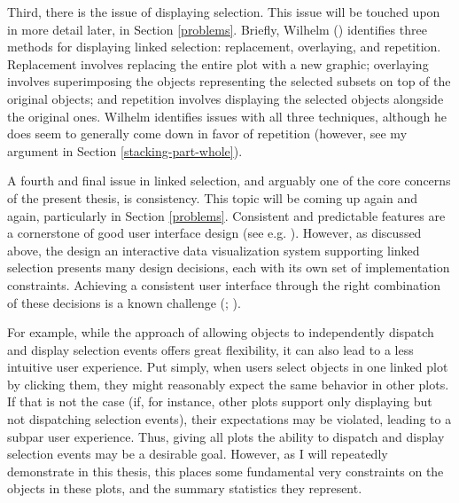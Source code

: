 \documentclass[
  openany]{book}
\theoremstyle{definition}
\theoremstyle{definition}
\theoremstyle{definition}
\theoremstyle{definition}
\theoremstyle{remark}
\begin{document}
Third, there is the issue of displaying selection. This issue will be touched upon in more detail later, in Section \ref{problems}. Briefly, Wilhelm () identifies three methods for displaying linked selection: replacement, overlaying, and repetition. Replacement involves replacing the entire plot with a new graphic; overlaying involves superimposing the objects representing the selected subsets on top of the original objects; and repetition involves displaying the selected objects alongside the original ones. Wilhelm identifies issues with all three techniques, although he does seem to generally come down in favor of repetition (however, see my argument in Section \ref{stacking-part-whole}).

A fourth and final issue in linked selection, and arguably one of the core concerns of the present thesis, is consistency. This topic will be coming up again and again, particularly in Section \ref{problems}. Consistent and predictable features are a cornerstone of good user interface design (see e.g. ). However, as discussed above, the design an interactive data visualization system supporting linked selection presents many design decisions, each with its own set of implementation constraints. Achieving a consistent user interface through the right combination of these decisions is a known challenge (; ).

For example, while the approach of allowing objects to independently dispatch and display selection events offers great flexibility, it can also lead to a less intuitive user experience. Put simply, when users select objects in one linked plot by clicking them, they might reasonably expect the same behavior in other plots. If that is not the case (if, for instance, other plots support only displaying but not dispatching selection events), their expectations may be violated, leading to a subpar user experience. Thus, giving all plots the ability to dispatch and display selection events may be a desirable goal. However, as I will repeatedly demonstrate in this thesis, this places some fundamental very constraints on the objects in these plots, and the summary statistics they represent.
\end{document}
